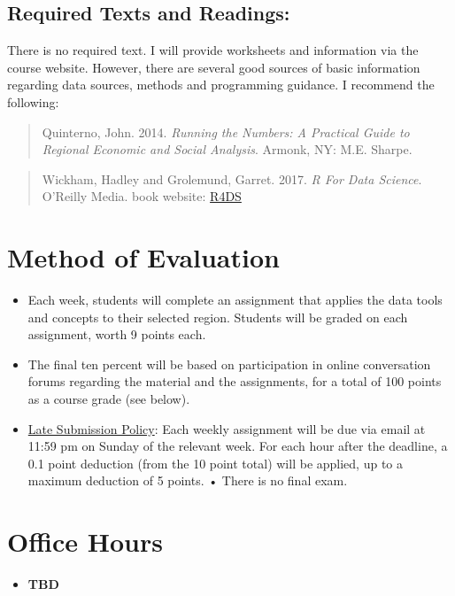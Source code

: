 \documentclass[11pt,]{article}
\providecommand{\tightlist}{%
  \setlength{\itemsep}{0pt}\setlength{\parskip}{0pt}}
\begin{document}
\subsection{Required Texts and
Readings:}\label{required-texts-and-readings}

There is no required text. I will provide worksheets and information via
the course website. However, there are several good sources of basic
information regarding data sources, methods and programming guidance. I
recommend the following:

\begin{quote}
Quinterno, John. 2014. \emph{Running the Numbers: A Practical Guide to
Regional Economic and Social Analysis}. Armonk, NY: M.E. Sharpe.
\end{quote}

\begin{quote}
Wickham, Hadley and Grolemund, Garret. 2017. \emph{R For Data Science}.
O'Reilly Media. book website: \href{https://r4ds.had.co.nz/}{R4DS}
\end{quote}

\section{Method of Evaluation}\label{method-of-evaluation}

\begin{itemize}
\item
  Each week, students will complete an assignment that applies the data
  tools and concepts to their selected region. Students will be graded
  on each assignment, worth 9 points each.
\item
  The final ten percent will be based on participation in online
  conversation forums regarding the material and the assignments, for a
  total of 100 points as a course grade (see below).
\item
  \underline{Late Submission Policy}: Each weekly assignment will be due
  via email at 11:59 pm on Sunday of the relevant week. For each hour
  after the deadline, a 0.1 point deduction (from the 10 point total)
  will be applied, up to a maximum deduction of 5 points. • There is no
  final exam.
\end{itemize}

\section{Office Hours}\label{office-hours}

\begin{itemize}
\tightlist
\item
  \textbf{TBD}
\end{itemize}
\end{document}

